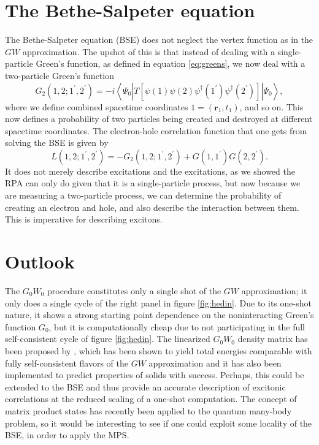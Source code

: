 \documentclass[12pt]{article}
\begin{document}
\section{The Bethe-Salpeter equation}
The Bethe-Salpeter equation (BSE) does not neglect the vertex function as in the $GW$ approximation. The upshot of this is that instead of dealing with a single-particle Green's function, as defined in equation \ref{eq:greens}, we now deal with a two-particle Green's function
\begin{equation}
  G_2\left(1,2 ; 1^{\prime}, 2^{\prime}\right)=-i\left\langle\Psi_0\left|T\left[\psi\left(1\right) \psi\left(2\right) \psi^{\dagger}\left(1^{\prime}\right) \psi^{\dagger}\left(2^{\prime}\right)\right]\right| \Psi_0\right\rangle,
\end{equation}
where we define combined spacetime coordinates $1=(\mathbf{r}_1, t_1)$, and so on. This now defines a probability of two particles being created and destroyed at different spacetime coordinates. The electron-hole correlation function\autocite{reining_10_nodate} that one gets from solving the BSE is given by
\begin{equation}
L\left(1,2 ; 1^{\prime}, 2^{\prime}\right)=-G_2\left(1,2 ; 1^{\prime}, 2^{\prime}\right)+G\left(1,1^{\prime}\right) G\left(2,2^{\prime}\right).
\end{equation}
It does not merely describe excitations and the excitations, as we showed the RPA can only do given that it is a single-particle process, but now because we are measuring a two-particle process, we can determine the probability of creating an electron and hole, and also describe the interaction between them. This is imperative for describing excitons.
\section{Outlook}
The $G_0W_0$ procedure constitutes only a single shot of the $GW$ approximation; it only does a single cycle of the right panel in figure \ref{fig:hedin}. Due to its one-shot nature, it shows a strong starting point dependence on the noninteracting Green's function $G_0$, but it is computationally cheap due to not participating in the full self-consistent cycle of figure \ref{fig:hedin}. The linearized $G_0W_0$ density matrix has been proposed by \textcite{bruneval_assessment_2019}, which has been shown to yield total energies comparable with fully self-consistent flavors of the $GW$ approximation\autocite{bruneval_improved_2021} and it has also been implemented to predict properties of solids with success\autocite{denawi_gw_2023}. Perhaps, this could be extended to the BSE and thus provide an accurate description of excitonic correlations at the reduced scaling of a one-shot computation. The concept of matrix product states has recently been applied to the quantum many-body problem\autocite{schollwock_density-matrix_2011}, so it would be interesting to see if one could exploit some locality of the BSE, in order to apply the MPS.
\printbibliography[heading=bibintoc]
\end{document}
